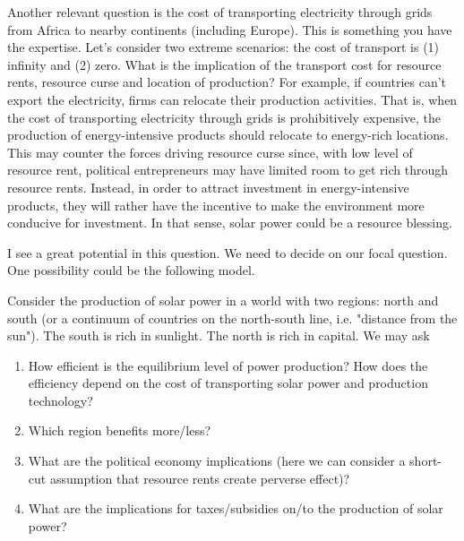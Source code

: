 \documentclass[12pt]{article}%
\begin{document}
\begin{itemize}
Another relevant question is the cost of transporting electricity through grids from Africa to nearby continents (including Europe). This is something you have the expertise. Let's consider two extreme scenarios: the cost of transport is  (1) infinity and (2) zero. What is the implication of the transport cost for resource rents, resource curse and location of production? For example, if countries can't export the electricity, firms can relocate their production activities. That is, when the cost of transporting electricity through grids is prohibitively expensive, the production of energy-intensive products should relocate to energy-rich locations. This may counter the forces driving resource curse since, with low level of resource rent, political entrepreneurs  may have limited room to get rich through resource rents. Instead, in order to attract investment in energy-intensive products, they will rather have the incentive to make the environment more conducive for investment.  In that sense, solar power could be a resource blessing.

I see a great potential in this question. We need to decide on our focal question. One possibility could be the following model.

Consider the production of solar power in a world with two regions: north and south (or a continuum of countries on the north-south line, i.e. "distance from the sun"). The south is rich in sunlight. The north is rich in capital. We may ask
\begin{enumerate}
    \item  How efficient is the equilibrium level of power production? How does the efficiency depend on the cost of transporting solar power and production technology?
    \item Which region benefits more/less?
    \item What are the political economy implications (here we can consider a short-cut assumption that resource rents create perverse effect)?
    \item What are the implications for taxes/subsidies on/to the production of solar power?
\end{enumerate}
\end{itemize}
\end{document}
